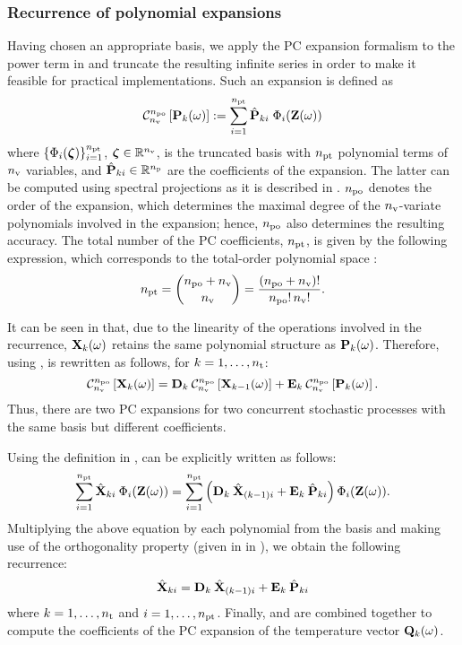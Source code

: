 \subsubsection{Recurrence of polynomial expansions} 
Having chosen an appropriate basis, we apply the PC expansion formalism to the power term in  and truncate the resulting infinite series in order to make it feasible for practical implementations.
Such an expansion is defined as
\begin{equation} \elabel{pc-expansion}
  \oPC{\nvars}{\pcorder}{\vP_k(\o)} := \sum_{i = 1}^{\pcterms} \pcc{\vP}_{ki} \; \pcb_i(\vZ(\o))
\end{equation}
where $\{ \Phi_i(\boldsymbol{\zeta}) \}_{i = 1}^{{n_\text{pt}}}$, $\boldsymbol{\zeta} \in \mathbb{R}^{n_\text{v}}$, is the truncated basis with ${n_\text{pt}}$ polynomial terms of ${n_\text{v}}$ variables, and $\hat{\mathbf{P}}_{ki} \in \mathbb{R}^{n_\text{p}}$ are the coefficients of the expansion.
The latter can be computed using spectral projections as it is described in .
${n_\text{po}}$ denotes the order of the expansion, which determines the maximal degree of the ${n_\text{v}}$-variate polynomials involved in the expansion; hence, ${n_\text{po}}$ also determines the resulting accuracy.
The total number of the PC coefficients, ${n_\text{pt}}$, is given by the following expression, which corresponds to the total-order polynomial space \cite{eldred2008, beck2011}:
\begin{equation} \elabel{pc-terms}
  \pcterms = { \pcorder + \nvars \choose \nvars } = \frac{(\pcorder + \nvars)!}{\pcorder! \, \nvars!}.
\end{equation}

It can be seen in  that, due to the linearity of the operations involved in the recurrence, $\mathbf{X}_k(\omega)$ retains the same polynomial structure as $\mathbf{P}_k(\omega)$. Therefore, using ,  is rewritten as follows, for $k = 1, \dotsc, {n_\text{t}}$:
\begin{equation} \elabel{expanded-recurrence}
  \oPC{\nvars}{\pcorder}{\vX_k(\o)} = \mCF_k \: \oPC{\nvars}{\pcorder}{\vX_{k-1}(\o)} + \mCS_k \: \oPC{\nvars}{\pcorder}{\vP_k(\o)}.
\end{equation}
Thus, there are two PC expansions for two concurrent stochastic processes with the same basis but different coefficients.

Using the definition in ,  can be explicitly written as follows:
\[
  \sum_{i = 1}^{\pcterms} \pcc{\vX}_{ki} \: \pcb_i(\vZ(\o)) = \sum_{i = 1}^{\pcterms} \left( \mCF_k \: \pcc{\vX}_{(k - 1)i} + \mCS_k \: \pcc{\vP}_{ki} \right) \pcb_i(\vZ(\o)).
\]
Multiplying the above equation by each polynomial from the basis and making use of the orthogonality property (given in  in ), we obtain the following recurrence:
\begin{equation} \elabel{pc-recurrence}
  \pcc{\vX}_{ki} = \mCF_k \: \pcc{\vX}_{(k - 1)i} + \mCS_k \: \pcc{\vP}_{ki}
\end{equation}
where $k = 1, \dotsc, {n_\text{t}}$ and $i = 1, \dotsc, {n_\text{pt}}$. Finally,  and  are combined together to compute the coefficients of the PC expansion of the temperature vector $\mathbf{Q}_k(\omega)$.

